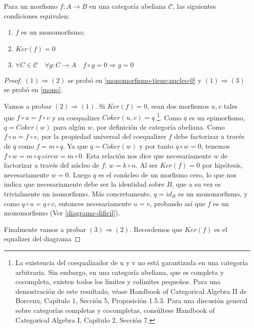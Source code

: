 \begin{proposicion} \label{proposicion-usual}
    Para un morfismo $f: A \longrightarrow B$ en una categoría abeliana $\mathscr{C}$, las siguientes condiciones equivalen:

    \begin{enumerate}
        \item $f$ es un monomorfismo;
        \item $Ker(f) = 0$
        \item $\forall C \in \mathscr{C} \quad \forall g: C \longrightarrow A \quad f \circ g = 0 \Rightarrow g = 0$
    \end{enumerate}
\end{proposicion}
\begin{proof}
    $(1) \Rightarrow (2)$ se probó en \ref{monomorfismo-tiene-nucleo-0} y $(1) \Rightarrow (3)$ se probó en \ref{mono}. 
    
    Vamos a probar $(2) \Rightarrow (1)$. Si $Ker(f) = 0$, sean dos morfismos $u,v$ tales que $f \circ u = f \circ v$ y su coequalizer $Coker(u,v) = q$ \footnote{La existencia del coequalizador de u y v no está garantizada en una categoría arbitraria. Sin embargo, en una categoría abeliana, que es completa y cocompleta, existen todos los límites y colímites pequeños. Para una demostración de este resultado, véase Handbook of Categorical Algebra II de Borceux, Capítulo 1, Sección 5, Proposición 1.5.3. Para una discusión general sobre categorías completas y cocompletas, consúltese Handbook of Categorical Algebra I, Capítulo 2, Sección 7.}. Como $q$ es un epimorfismo, $q = Coker(w)$ para algún $w$, por definición de categoría abeliana. Como $f \circ u = f \circ v$, por la propiedad universal del coequalizer $f$ debe factorizar a través de $q$ como $f = m \circ q$. Ya que $q = Coker(w)$ y por tanto $q \circ w = 0$, tenemos $f \circ w = m \circ q \ circ w = m \circ 0$. Esta relación nos dice que necesariamente $w$ de factorizar a través del núcleo de $f$: $w = k \circ n$. Al ser $Ker(f) = 0$ por hipótesis, necesariamente $w = 0$. Luego $q$ es el conúcleo de un morfismo cero, lo que nos indica que necesariamente debe ser la identidad sobre $B$, que a su vez es trivialmente un isomorfismo. Más concretamente, $q = id_B$ es un monomorfismo, y como $q \circ u = q \circ v$, entonces necesariamente $u = v$, probando así que $f$ es un monomorfismo (Ver \ref{diagrama-dificil}).

    Finalmente vamos a probar $(3) \Rightarrow (2)$. Recordemos que $Ker(f)$ es el equalizer del diagrama
    

\end{proof}
